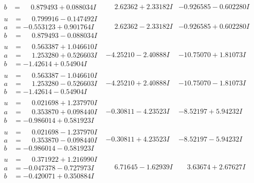 \documentclass[1p]{elsarticle_modified}
\theoremstyle{definition}
\begin{document}
$$\begin{array}{c|c|c}
\begin{aligned}
b &= \phantom{-}0.879493 + 0.088034 I\end{aligned}
 & \phantom{-}2.62362 + 2.33182 I & -0.926585 - 0.602280 I \\ \hline\begin{aligned}
u &= \phantom{-}0.799916 - 0.147492 I \\
a &= -0.553123 + 0.901764 I \\
b &= \phantom{-}0.879493 - 0.088034 I\end{aligned}
 & \phantom{-}2.62362 - 2.33182 I & -0.926585 + 0.602280 I \\ \hline\begin{aligned}
u &= \phantom{-}0.563387 + 1.046610 I \\
a &= \phantom{-}1.253280 + 0.526603 I \\
b &= -1.42614 + 0.54904 I\end{aligned}
 & -4.25210 - 2.40888 I & -10.75070 + 1.81073 I \\ \hline\begin{aligned}
u &= \phantom{-}0.563387 - 1.046610 I \\
a &= \phantom{-}1.253280 - 0.526603 I \\
b &= -1.42614 - 0.54904 I\end{aligned}
 & -4.25210 + 2.40888 I & -10.75070 - 1.81073 I \\ \hline\begin{aligned}
u &= \phantom{-}0.021698 + 1.237970 I \\
a &= \phantom{-}0.353870 + 0.098440 I \\
b &= -0.986014 + 0.581923 I\end{aligned}
 & -0.30811 - 4.23523 I & -8.52197 + 5.94232 I \\ \hline\begin{aligned}
u &= \phantom{-}0.021698 - 1.237970 I \\
a &= \phantom{-}0.353870 - 0.098440 I \\
b &= -0.986014 - 0.581923 I\end{aligned}
 & -0.30811 + 4.23523 I & -8.52197 - 5.94232 I \\ \hline\begin{aligned}
u &= \phantom{-}0.371922 + 1.216990 I \\
a &= -0.047378 - 0.727973 I \\
b &= -0.420071 + 0.350884 I\end{aligned}
 & \phantom{-}6.71645 - 1.62939 I & \phantom{-}3.63674 + 2.67627 I \\ \hline\begin{aligned}

\end{aligned}
\end{array}$$
\end{document}
